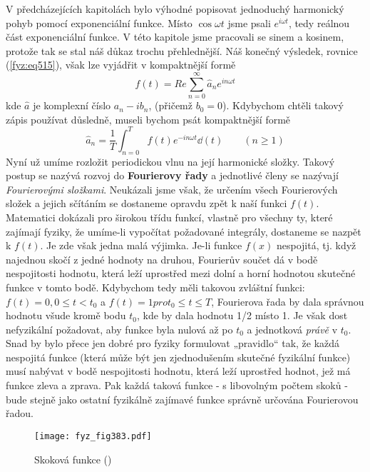   V předcházejících kapitolách bylo výhodné popisovat jednoduchý harmonický pohyb pomocí 
  exponenciální funkce. Místo \(\cos\omega t\) jsme psali \(e^{i\omega t}\), tedy reálnou část 
  exponenciální funkce. V této kapitole jsme pracovali se sinem a kosinem, protože tak se stal náš 
  důkaz trochu přehlednější. Náš konečný výsledek, rovnice (\ref{fyz:eq515}), však lze vyjádřit v 
  kompaktnější formě
  \begin{equation}\label{fyz:eq517}
    f(t) = Re\sum_{n=0}^{\infty}\hat{a}_n e^{in\omega t}
  \end{equation}
  kde \(\hat{a}\) je komplexní číslo \(a_n - ib_n\), (přičemž \(b_0 = 0\)). Kdybychom chtěli takový 
  zápis používat důsledně, museli bychom psát
  kompaktnější formě
  \begin{equation}\label{fyz:eq518}
    \hat{a}_n = \dfrac{1}{T}\int_{n=0}^{T}f(t) e^{-in\omega t}\dd(t)\qquad (n\geq1)
  \end{equation}
  Nyní už umíme rozložit periodickou vlnu na její harmonické složky. Takový postup se nazývá rozvoj 
  do \textbf{Fourierovy řady} a jednotlivé členy se nazývají \emph{Fourierovými složkami}. 
  Neukázali jsme však, že určením všech Fourierových složek a jejich sčítáním se dostaneme opravdu 
  zpět k naší funkci \(f(t)\). Matematici dokázali pro širokou třídu funkcí, vlastně pro všechny 
  ty, které zajímají fyziky, že umíme-li vypočítat požadované integrály, dostaneme se nazpět k 
  \(f(t)\). Je zde však jedna malá výjimka. Je-li funkce \(f(x)\) nespojitá, tj. když najednou 
  skočí z jedné hodnoty na druhou, Fourierův součet dá v bodě nespojitosti hodnotu, která leží 
  uprostřed mezi dolní a horní hodnotou skutečné funkce v tomto bodě. Kdybychom tedy měli takovou 
  zvláštní funkci: \(f(t) = 0, 0 \leq t<t_0\) a \(f(t) = 1 pro t_0 \leq t \leq T\), Fourierova řada 
  by dala správnou hodnotu všude kromě bodu \(t_0\), kde by dala hodnotu \num{1/2} místo \num{1}. 
  Je však dost nefyzikální požadovat, aby funkce byla nulová až po \(t_0\) a jednotková 
  \emph{právě} v \(t_0\).  Snad by bylo přece jen dobré pro fyziky formulovat „pravidlo“ tak, že 
  každá nespojitá funkce (která může být jen zjednodušením skutečné fyzikální funkce) musí nabývat 
  v bodě nespojitosti hodnotu, která leží uprostřed hodnot, jež má funkce zleva a zprava. Pak každá 
  taková funkce - s libovolným počtem skoků - bude stejně jako ostatní fyzikálně zajímavé funkce 
  správně určována Fourierovou řadou.
    
  \begin{figure}[ht!] %
    \centering
    \texttt{[image: fyz\_fig383.pdf]}
    \caption{Skoková funkce
             (\cite[s.~680]{Feynman01})}
    \label{fyz:fig383}
  \end{figure}
  
